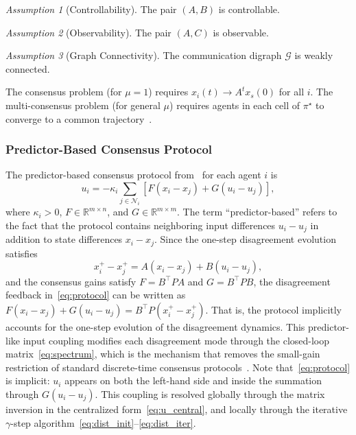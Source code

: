 \documentclass[12pt]{elsarticle}
\theoremstyle{remark}
\newtheorem{assumption}{Assumption}
\newcommand{\R}{\mathbb{R}}
\begin{document}
\begin{assumption}[Controllability]
\label{ass:controllable}
The pair $(A, B)$ is controllable.
\end{assumption}

\begin{assumption}[Observability]
\label{ass:observable}
The pair $(A, C)$ is observable.
\end{assumption}

\begin{assumption}[Graph Connectivity]
\label{ass:graph}
The communication digraph $\mathcal{G}$ is weakly connected.
\end{assumption}

The consensus problem (for $\mu = 1$) requires $x_i(t) \to A^t x_s(0)$ for all $i$. The multi-consensus problem (for general $\mu$) requires agents in each cell of $\pi^\star$ to converge to a common trajectory~\cite{cacace2024}.

\subsubsection{Predictor-Based Consensus Protocol}
\label{subsec:protocol}

The predictor-based consensus protocol from~\cite{cacace2024} for each agent $i$ is
\begin{equation}
u_i = -\kappa_i \sum_{j \in \mathcal{N}_i} \left[ F(x_i - x_j) + G(u_i - u_j) \right],
\label{eq:protocol}
\end{equation}
where $\kappa_i > 0$, $F \in \R^{m \times n}$, and $G \in \R^{m \times m}$. The term ``predictor-based'' refers to the fact that the protocol contains neighboring input differences $u_i - u_j$ in addition to state differences $x_i - x_j$. Since the one-step disagreement evolution satisfies
\begin{equation}
x_i^+ - x_j^+ = A(x_i - x_j) + B(u_i - u_j),
\label{eq:predictor_interp}
\end{equation}
and the consensus gains satisfy $F = B^\top P A$ and $G = B^\top P B$, the disagreement feedback in~\eqref{eq:protocol} can be written as $F(x_i - x_j) + G(u_i - u_j) = B^\top P(x_i^+ - x_j^+)$. That is, the protocol implicitly accounts for the one-step evolution of the disagreement dynamics. This predictor-like input coupling modifies each disagreement mode through the closed-loop matrix~\eqref{eq:spectrum}, which is the mechanism that removes the small-gain restriction of standard discrete-time consensus protocols~\cite{ma2015}. Note that~\eqref{eq:protocol} is implicit: $u_i$ appears on both the left-hand side and inside the summation through $G(u_i - u_j)$. This coupling is resolved globally through the matrix inversion in the centralized form~\eqref{eq:u_central}, and locally through the iterative $\gamma$-step algorithm~\eqref{eq:dist_init}--\eqref{eq:dist_iter}.
\end{document}
